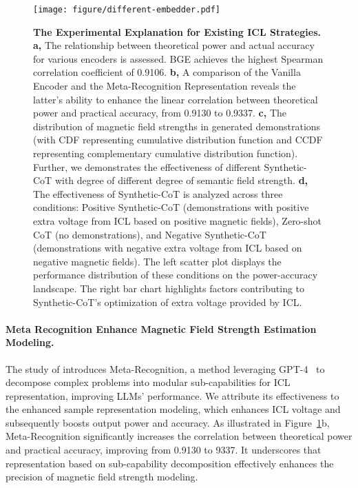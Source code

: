 \begin{figure}[t]
    \centering
    \texttt{[image: figure/different-embedder.pdf]}
    \caption{
        \textbf{The Experimental Explanation for Existing ICL Strategies.}\\
        \textbf{a,}
        The relationship between theoretical power and actual accuracy for various encoders is assessed. BGE achieves the highest Spearman correlation coefficient of 0.9106.
        \textbf{b,}
        A comparison of the Vanilla Encoder and the Meta-Recognition Representation reveals the latter’s ability to enhance the linear correlation between theoretical power and practical accuracy, from 0.9130 to 0.9337.
        \textbf{c,} The distribution of magnetic field strengths in generated demonstrations (with CDF representing cumulative distribution function and CCDF representing complementary cumulative distribution function). Further, we demonstrates the effectiveness of different Synthetic-CoT with degree of different degree of semantic field strength.
        \textbf{d,} The effectiveness of Synthetic-CoT is analyzed across three conditions: Positive Synthetic-CoT (demonstrations with positive extra voltage from ICL based on positive magnetic fields), Zero-shot CoT (no demonstrations), and Negative Synthetic-CoT (demonstrations with negative extra voltage from ICL based on negative magnetic fields).
        The left scatter plot displays the performance distribution of these conditions on the power-accuracy landscape. The right bar chart highlights factors contributing to Synthetic-CoT's optimization of extra voltage provided by ICL.
    }
    \label{fig:icl-exploration}
\end{figure}


\paragraph{Meta Recognition Enhance Magnetic Field Strength Estimation Modeling.}
The study of \citet{didolkar2024metacognitive} introduces Meta-Recognition, a method leveraging GPT-4~\cite{achiam2023gpt} to decompose complex problems into modular sub-capabilities for ICL representation, improving LLMs' performance.
We attribute its effectiveness to the enhanced sample representation modeling, which enhances ICL voltage and subsequently boosts output power and accuracy.
As illustrated in Figure~\ref{fig:icl-exploration}b, Meta-Recognition significantly increases the correlation between theoretical power and practical accuracy, improving from 0.9130 to 9337. It underscores that representation based on sub-capability decomposition effectively enhances the precision of magnetic field strength modeling.

